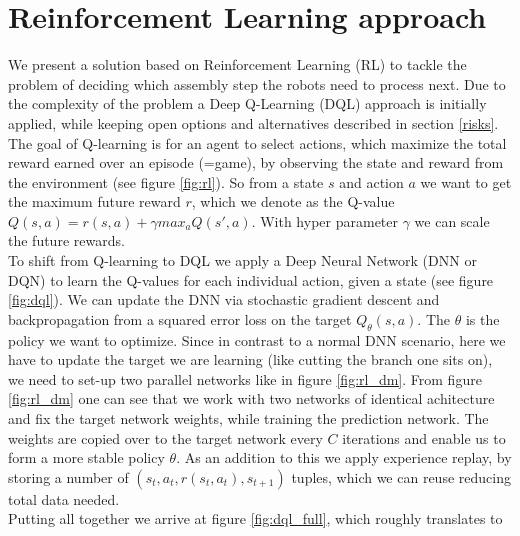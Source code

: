 \documentclass[runningheads,envcountsect]{llncs}
\begin{document}
\section{Reinforcement Learning approach}
We present a solution based on Reinforcement Learning (RL) to tackle the problem of deciding which assembly step the robots need to process next. Due to the complexity of the problem a Deep Q-Learning (DQL) approach is initially applied, while keeping open options and alternatives described in section \ref{risks}.\\
The goal of Q-learning is for an agent to select actions, which maximize the total reward earned over an episode (=game), by observing the state and reward from the environment (see figure \ref{fig:rl}). So from a state $s$ and action $a$ we want to get the maximum future reward $r$, which we denote as the Q-value $Q(s,a)=r(s,a)+\gamma max_a Q(s',a)$. With hyper parameter $\gamma$ we can scale the future rewards.\\
To shift from Q-learning to DQL we apply a Deep Neural Network (DNN or DQN) to learn the Q-values for each individual action, given a state (see figure \ref{fig:dql}). We can update the DNN via stochastic gradient descent and backpropagation from a squared error loss on the target $Q_\theta(s,a)$. The $\theta$ is the policy we want to optimize. Since in contrast to a normal DNN scenario, here we have to update the target we are learning (like cutting the branch one sits on), we need to set-up two parallel networks like in figure \ref{fig:rl_dm}. From figure \ref{fig:rl_dm} one can see that we work with two networks of identical achitecture and fix the target network weights, while training the prediction network. The weights are copied over to the target network every $C$ iterations and enable us to form a more stable policy $\theta$. As an addition to this we apply experience replay, by storing a number of $(s_t, a_t, r(s_t, a_t), s_{t+1})$ tuples, which we can reuse reducing total data needed.\\
Putting all together we arrive at figure \ref{fig:dql_full}, which roughly translates to
\end{document}
